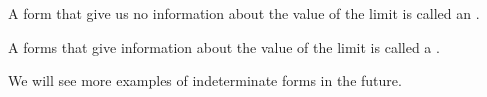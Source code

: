 \documentclass{ximera}
\begin{document}
\begin{definition}
A form that give us no information about the value of the limit is
called an .

A forms that give information about the value of the limit is called a
.
\end{definition}  

We will see more examples of indeterminate forms in the future.
\end{document}
